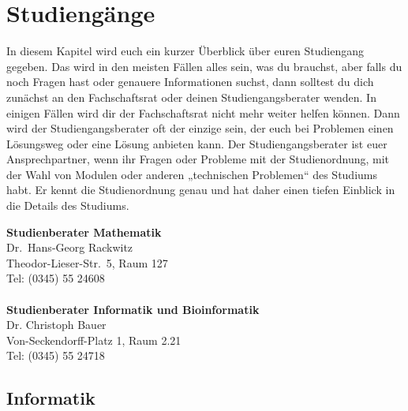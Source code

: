 
\section{Studiengänge}

In diesem Kapitel wird euch ein kurzer Überblick über euren Studiengang gegeben.
Das wird in den meisten Fällen alles sein, was du brauchst, aber falls du noch Fragen hast oder genauere Informationen suchst, dann solltest du dich zunächst an den Fachschaftsrat oder deinen Studiengangsberater wenden.
In einigen Fällen wird dir der Fachschaftsrat nicht mehr weiter helfen können.
Dann wird der Studiengangsberater oft der einzige sein, der euch bei Problemen einen Lösungsweg oder eine Lösung anbieten kann.
Der Studiengangsberater ist euer Ansprechpartner, wenn ihr Fragen oder Probleme mit der Studienordnung, mit der Wahl von Modulen oder anderen „technischen Problemen“ des Studiums habt.
Er kennt die Studienordnung genau und hat daher einen tiefen Einblick in die Details des Studiums.

\textbf{Studienberater Mathematik}\\
Dr.\ Hans-Georg Rackwitz\\
Theodor-Lieser-Str.\ 5, Raum 127\\
Tel: (0345) 55 24608\\
\\

\textbf{Studienberater Informatik und Bioinformatik}\\
Dr. Christoph Bauer\\
Von-Seckendorff-Platz 1, Raum 2.21\\
Tel: (0345) 55 24718\\



\subsection{Informatik}
\label{studiengang_informatik}
    
